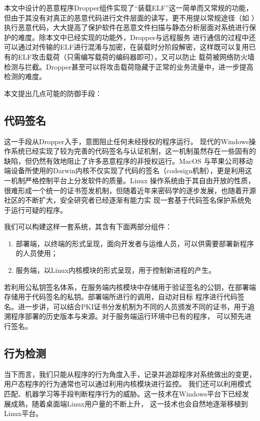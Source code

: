 本文中设计的恶意程序Dropper组件实现了“装载ELF”这一简单而又常规的功能，但由于其没有对真正的恶意代码进行文件层面的读写，更不用提以常规途径（如
）执行恶意代码，大大提高了保护软件在恶意文件扫描与静态分析层面对系统进行保护的难度。除本文中已经实现的功能外，Dropper与远程服务
进行通信的过程中还可以通过对传输的ELF进行混淆与加密，在装载时分阶段解密，这样既可以复用已有的ELF攻击载荷（只需编写载荷的编码器即可），又可以防止
载荷被网络防火墙检测与拦截。Dropper甚至可以将攻击载荷隐藏于正常的业务流量中，进一步提高检测的难度。

本文提出几点可能的防御手段：

\subsection{代码签名}

这一手段从Dropper入手，意图阻止任何未经授权的程序运行。
现代的Windows操作系统已经实现了较为完善的代码签名与认证机制，这一机制虽然存在一些固有的缺陷，但仍然有效地阻止了许多恶意程序的非授权运行。MacOS
与苹果公司移动端设备所使用的Darwin内核不仅实现了代码的签名（codesign机制），更是利用这一机制严格控制平台上分发软件的质量。Linux
操作系统由于其自由开放的性质，很难形成一个统一的证书签发机制，但随着近年来密码学的逐步发展，也随着开源社区的不断扩大，安全研究者已经逐渐有能力实
现一套基于代码签名保护系统免于运行可疑的程序。

我们可以构建这样一套系统，其含有下面两部分组件：

\begin{enumerate}
\item 部署端，以终端的形式呈现，面向开发者与运维人员，可以供需要部署新程序的人员使用；
\item 服务端，以Linux内核模块的形式呈现，用于控制新进程的产生。
\end{enumerate}

若利用公私钥签名体系，在服务端内核模块中存储用于验证签名的公钥，在部署端存储用于代码签名的私钥。部署端所进行的调用，自动对目标
程序进行代码签名。进一步讲，可以结合PKI证书分发机制为不同的人员颁发不同的证书，用于追溯程序部署的历史版本与来源。对于服务端运行环境中已有的程序，
可以预先进行签名。

\subsection{行为检测}

当下而言，我们只能从程序的行为角度入手，记录并追踪程序对系统做出的变更，用户态程序的行为通常也可以通过利用内核模块进行监控。
我们还可以利用模式匹配、机器学习等手段判断程序行为的威胁。这一技术在Windows平台下已经发展成熟，随着桌面端Linux用户量的不断上升，
这一技术也会自然地逐渐移植到Linux平台。

